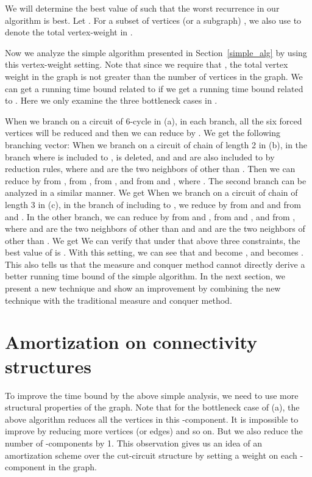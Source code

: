 \documentclass[runningheads]{llncs}
\begin{document}
We will determine the best value of  such that the worst recurrence in our algorithm is best.
Let . For a subset of vertices (or a subgraph) , we also use  to denote the total vertex-weight in .


Now we analyze the simple algorithm presented in Section~\ref{simple_alg} by using this vertex-weight setting. Note that since we require that , the total vertex weight  in the graph is not greater than the number  of vertices in the graph. We can get a running time bound related to  if we get a running time bound related to .
Here we only examine the three bottleneck cases in .

When we branch on a circuit of 6-cycle in (a),  in  each branch,
all the six forced vertices will be reduced and then we can reduce  by .
We get the following branching vector:
When we branch on a circuit  of chain of length 2 in (b), in the branch where  is included to ,  is deleted, and  and  are also included to  by reduction rules, where  and  are the two neighbors of  other than . Then we can reduce  by  from ,  from ,  from , and  from  and , where . The second branch can be analyzed in a similar manner. We get
When we branch on a circuit  of chain of length 3 in (c), in the branch of including  to , we reduce  by  from  and  and  from  and . In the other branch, we can reduce  by  from  and ,  from  and , and  from , where  and  are the two neighbors of  other than  and  and  are the two neighbors of  other than . We get
We can verify that under that above three constraints, the best value of  is . With this setting, we can see that  and  become , and  becomes . This also tells us that the measure and conquer method cannot directly derive a better running time bound of the simple algorithm. In the next section, we present a new technique and show an improvement by combining the new technique with the traditional measure and conquer method.

\section{Amortization on connectivity structures}
To improve the time bound by the above simple analysis, we need to use more structural properties of the graph.
Note that for the bottleneck case of (a), the above algorithm reduces all the vertices in this -component. It is impossible to improve by reducing more vertices (or edges) and so on. But we also reduce the number of -components by 1. This observation gives us an idea of an amortization scheme over the cut-circuit structure by setting a weight on each -component in the graph.
\end{document}

